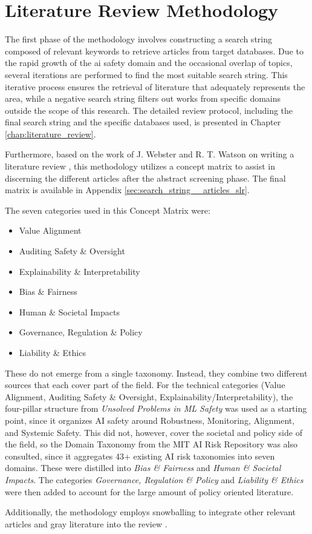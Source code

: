 

	\section{Literature Review Methodology}

	The first phase of the methodology involves constructing a search string composed of relevant keywords to retrieve articles from target databases. Due to the rapid growth of the \gls{ai} safety domain and the occasional overlap of topics, several iterations are performed to find the most suitable search string. This iterative process ensures the retrieval of literature that adequately represents the area, while a negative search string filters out works from specific domains outside the scope of this research. The detailed review protocol, including the final search string and the specific databases used, is presented in Chapter \ref{chap:literature_review}.

	Furthermore, based on the work of J. Webster and R. T. Watson on writing a literature review \cite{webster_analyzing_2002}, this methodology utilizes a concept matrix to assist in discerning the different articles after the abstract screening phase. The final matrix is available in Appendix \ref{sec:search_string__articles_slr}.

	The seven categories used in this Concept Matrix were:
	\begin{itemize}
		\item Value Alignment
		\item Auditing Safety \& Oversight
		\item Explainability \& Interpretability
		\item Bias \& Fairness
		\item Human \& Societal Impacts
		\item Governance, Regulation \& Policy
		\item Liability \& Ethics
	\end{itemize}
	
	These do not emerge from a single taxonomy. Instead, they combine two different sources that each cover part of the field. For the technical categories (Value Alignment, Auditing Safety \& Oversight, Explainability/Interpretability), the four-pillar structure from \textit{Unsolved Problems in ML Safety} \cite{hendrycks2021unsolved} was used as a starting point, since it organizes AI safety around Robustness, Monitoring, Alignment, and Systemic Safety. This did not, however, cover the societal and policy side of the field, so the Domain Taxonomy from the MIT AI Risk Repository \cite{Slattery_2026} was also consulted, since it aggregates 43+ existing AI risk taxonomies into seven domains. These were distilled into \textit{Bias \& Fairness} and \textit{Human \& Societal Impacts}. The categories \textit{Governance, Regulation \& Policy} and \textit{Liability \& Ethics} were then added to account for the large amount of policy oriented literature.

	Additionally, the methodology employs snowballing to integrate other relevant articles and gray literature into the review \cite{wohlin_guidelines_2014}.


